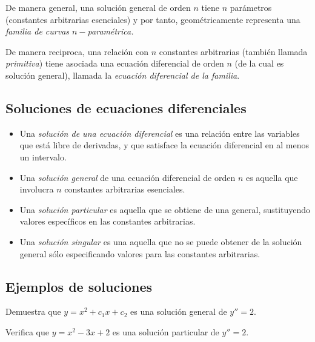 \begin{definicion}
	De manera general, una solución general de orden $ n $ tiene $ n $ parámetros (constantes arbitrarias esenciales) y por tanto, geométricamente representa una \emph{familia de curvas $n-$paramétrica. }

	De manera reciproca, una relación con $ n $ constantes arbitrarias (también llamada \emph{primitiva}) tiene asociada una ecuación diferencial de orden $n$ (de la cual es solución general), llamada la \emph{ecuación diferencial de la familia}.

\end{definicion}

\subsection{Soluciones de ecuaciones diferenciales}

\begin{itemize}
	\item 	Una \emph{solución de una ecuación diferencial} es una relación entre las variables que está libre de derivadas, y que satisface la ecuación diferencial en al menos un intervalo.
	\item
	Una \emph{solución general} de una ecuación diferencial de orden $ n $ es aquella que involucra $ n $ constantes arbitrarias esenciales.
	\item 	Una \emph{solución particular} es aquella que se obtiene de una general, sustituyendo valores específicos en las constantes arbitrarias.
	\item 	Una \emph{solución singular} es una aquella que no se puede obtener de la solución general sólo especificando valores para las constantes arbitrarias.
\end{itemize}


\subsection{Ejemplos de soluciones}

	\begin{resuelto}
		\label{exmp 02:06}
		Demuestra que $ y=x^{2}+c_{1}x+c_{2} $ es una solución general de $ y''=2 $.
	\end{resuelto}

	\begin{resuelto}
		\label{exmp 02:08}
		Verifica que $ y = x^2-3x+2 $ es una solución particular de $ y''=2 $.
	\end{resuelto}

